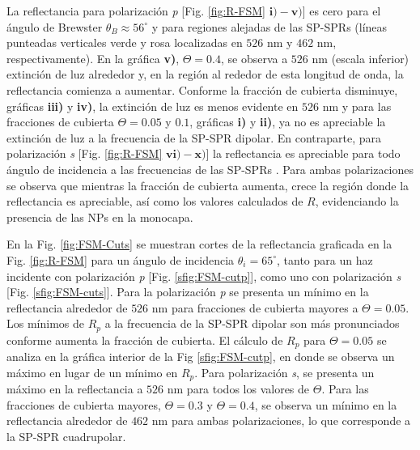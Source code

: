 La reflectancia para polarización \emph{p} [Fig. \ref{fig:R-FSM} $\mathbf{i)-v)}$] es cero para el ángulo de Brewster $\theta_B \approx 56^\circ$ y para regiones alejadas de las SP-SPRs (líneas punteadas verticales verde y rosa  localizadas en $526$ nm y $462$ nm, respectivamente). En la gráfica \textbf{v)}, $\Theta=0.4$,  se observa a $526$ nm (escala inferior) extinción de luz alrededor y, en la región al rededor de esta longitud de onda, la reflectancia comienza a aumentar. Conforme la fracción de cubierta disminuye, gráficas \textbf{iii)} y \textbf{iv)}, la extinción de luz es  menos evidente en $526$ nm y para las fracciones de cubierta $\Theta=0.05$ y $0.1$, gráficas \textbf{i)} y \textbf{ii)}, ya no es apreciable la extinción de luz a la frecuencia de la SP-SPR dipolar. En contraparte, para polarización \emph{s} [Fig. \ref{fig:R-FSM} $\mathbf{vi)-x)}$] la reflectancia es apreciable para todo ángulo de incidencia a las frecuencias de las SP-SPRs . Para ambas polarizaciones se observa que mientras la fracción de cubierta aumenta,  crece la región donde la reflectancia es apreciable, así como los valores calculados de $R$, evidenciando la presencia de las NPs en la monocapa.

En la Fig. \ref{fig:FSM-Cuts} se muestran cortes de la reflectancia graficada en la Fig. \ref{fig:R-FSM} para un ángulo de incidencia $\theta_i = 65^\circ$, tanto para un haz incidente con polarización \emph{p} [Fig. \ref{sfig:FSM-cutp}], como uno con polarización \emph{s} [Fig. \ref{sfig:FSM-cuts}]. Para la polarización \emph{p} se presenta un mínimo en la reflectancia alrededor de $526$ nm para fracciones de cubierta mayores a $\Theta = 0.05$. Los mínimos de $R_p$ a la frecuencia de la SP-SPR dipolar son más pronunciados conforme aumenta la fracción de cubierta. El cálculo  de $R_p$ para $\Theta=0.05$ se analiza en la gráfica interior de la Fig \ref{sfig:FSM-cutp}, en donde se observa un máximo en lugar de un mínimo en $R_p$. Para polarización \emph{s}, se presenta un máximo en la reflectancia a $526$ nm para todos los valores de $\Theta$. Para las fracciones de cubierta mayores, $\Theta = 0.3$ y $\Theta = 0.4$,  se observa un  mínimo en la reflectancia alrededor de $462$ nm para ambas polarizaciones, lo que corresponde a la SP-SPR cuadrupolar.

